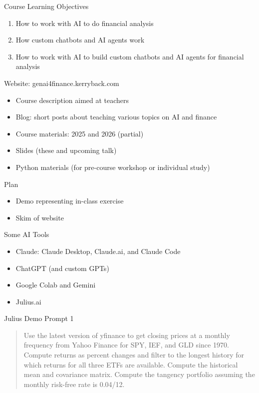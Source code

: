 \documentclass{beamer}
\begin{document}
\begin{frame}{Course Learning Objectives}
\begin{enumerate}
\item How to work with AI to do financial analysis
\item How custom chatbots and AI agents work 
\item How to work with AI to build custom chatbots and AI agents for financial analysis
\end{enumerate}
\end{frame}

\begin{frame}{Website: genai4finance.kerryback.com}
\begin{itemize}
\item Course description aimed at teachers
\item Blog: short posts about teaching various topics on AI and finance 
\item Course materials: 2025 and 2026 (partial)
\item Slides (these and upcoming talk)
\item Python materials (for pre-course workshop or individual study)
\end{itemize}
\end{frame} 

\begin{frame}{Plan}
    \begin{itemize}
     \item Demo representing in-class exercise
     \item Skim of website
    \end{itemize}
\end{frame}

\begin{frame}{Some AI Tools}
    \begin{itemize}
    \item Claude: Claude Desktop, Claude.ai, and Claude Code 
    \item ChatGPT (and custom GPTs)
    \item Google Colab and Gemini
    \item Julius.ai
    \end{itemize}
\end{frame}

\begin{frame}{Julius Demo Prompt 1}
   \begin{quote}
   Use the latest version of yfinance to get closing prices at a monthly frequency from Yahoo Finance for SPY, IEF, and GLD since 1970. Compute returns as percent changes and filter to the longest history for which returns for all three ETFs are available. Compute the historical mean and covariance matrix. Compute the tangency portfolio assuming the monthly risk-free rate is 0.04/12.

   \end{quote}
\end{frame}
\end{document}
